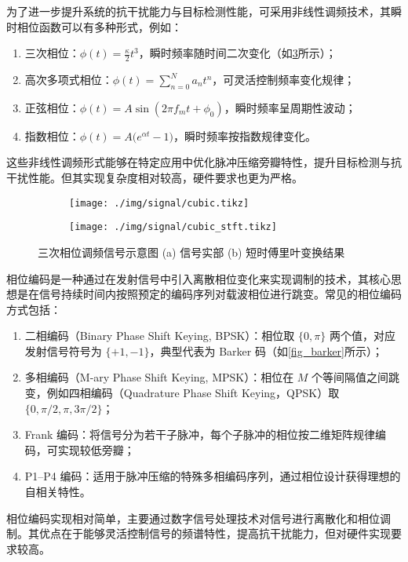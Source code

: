 为了进一步提升系统的抗干扰能力与目标检测性能，可采用非线性调频技术，其瞬时相位函数可以有多种形式，例如：
\begin{enumerate}
    \item 三次相位：$\phi(t) = \frac{\kappa}{2} t^3$，瞬时频率随时间二次变化（如\cref{fig_cubic}所示）；
    \item 高次多项式相位：$\phi(t) = \sum_{n=0}^{N} a_n t^n$，可灵活控制频率变化规律；
    \item 正弦相位：$\phi(t) = A \sin(2 \pi f_m t + \phi_0)$，瞬时频率呈周期性波动；
    \item 指数相位：$\phi(t) = A \big(e^{\alpha t} - 1\big)$，瞬时频率按指数规律变化。
\end{enumerate}
这些非线性调频形式能够在特定应用中优化脉冲压缩旁瓣特性，提升目标检测与抗干扰性能。但其实现复杂度相对较高，硬件要求也更为严格。

\begin{figure}[htb!]
    \centering
    \begin{subfigure}{.45\textwidth}
        \centering
        \texttt{[image: ./img/signal/cubic.tikz]}
        \caption{}
        \label{fig_cubic_1}
    \end{subfigure}
    \begin{subfigure}{.45\textwidth}
        \centering
        \texttt{[image: ./img/signal/cubic\_stft.tikz]}
        \caption{}
        \label{fig_cubic_2}
    \end{subfigure}
    \caption{三次相位调频信号示意图 (a) 信号实部 (b) 短时傅里叶变换结果}
    \label{fig_cubic}
\end{figure}


相位编码是一种通过在发射信号中引入离散相位变化来实现调制的技术，其核心思想是在信号持续时间内按照预定的编码序列对载波相位进行跳变。常见的相位编码方式包括：
\begin{enumerate}
    \item 二相编码（Binary Phase Shift Keying, BPSK）：相位取 $\{0, \pi\}$ 两个值，对应发射信号符号为 $\{+1, -1\}$，典型代表为 Barker 码（如\cref{fig_barker}所示）；
    \item 多相编码（M-ary Phase Shift Keying, MPSK）：相位在 $M$ 个等间隔值之间跳变，例如四相编码（Quadrature Phase Shift Keying，QPSK）取 $\{0, \pi/2, \pi, 3\pi/2\}$；
    \item Frank 编码：将信号分为若干子脉冲，每个子脉冲的相位按二维矩阵规律编码，可实现较低旁瓣；
    \item P1--P4 编码：适用于脉冲压缩的特殊多相编码序列，通过相位设计获得理想的自相关特性。
\end{enumerate}
相位编码实现相对简单，主要通过数字信号处理技术对信号进行离散化和相位调制。其优点在于能够灵活控制信号的频谱特性，提高抗干扰能力，但对硬件实现要求较高。

